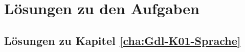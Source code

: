\newcommand{\AUTOR}{Andreas Zeh-Marschke}
\newcommand{\AUTORKURZ}{A. Zeh-Marschke}
\newcommand{\TITEL}{Mathematische Grundlagen}
\newcommand{\UNTERTITEL}{Grundbegriffe}
\newcommand{\DATUM}{21.04.2025}
\newcommand{\VERSION}{0.8-024}
\newcommand{\IDENT}{MathGdl.tex}
\newcommand{\BIBLIOTHEK}{BibMathGdl.bib}
\newcommand{\COPYRIGHT}{2025}

\newcommand{\INDEXNAMEN}{JA}
\newcommand{\INDEXABKUERZUNGEN}{JA}




\hyphenation{ }

\deckblattBuch


\tableofcontents

\listoffigures
\listoftables

\newcommand{\mitAufgaben}{Ja}
\newcommand{\mitLoesungen}{Nein}


%
%
%
%
%

\appendix
%
\renewcommand{\mitAufgaben}{Nein}
\renewcommand{\mitLoesungen}{Ja}

\setcounter{section}{11}
\chapter{Lösungen zu den Aufgaben}
\section{Lösungen zu Kapitel \ref{cha:Gdl-K01-Sprache}}


\printbibliography  %
\PRINTINDEXES


